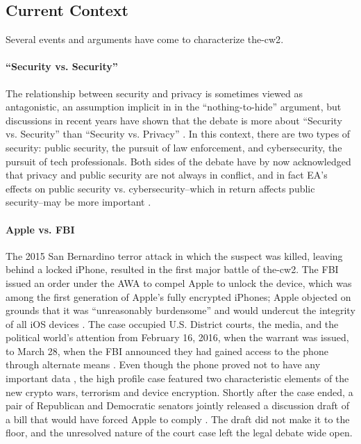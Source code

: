 \subsection{Current Context}
\label{sec-history-current}

Several events and arguments have come to characterize \ac{the-cw2}.

\paragraph*{``Security vs. Security''} The relationship between security and privacy is sometimes viewed as
antagonistic, an assumption implicit in in the ``nothing-to-hide'' argument, but discussions in recent years have shown
that the debate is more about ``Security vs. Security'' than ``Security vs. Privacy''
\cite{stalla_bourdillon_privacy_2014}. In this context, there are two types of security: public security, the pursuit of
law enforcement, and cybersecurity, the pursuit of tech professionals. Both sides of the debate have by now acknowledged
that privacy and public security are not always in conflict, and in fact \ac{EA}'s effects on public security vs.
cybersecurity--which in return affects public security--may be more important \cite{schneier_2019}.

\paragraph*{Apple vs. FBI} The 2015 San Bernardino terror attack in which the suspect was killed, leaving behind a
locked iPhone, resulted in the first major battle of \ac{the-cw2}. The \ac{FBI} issued an order under the \acrlong{AWA}
to compel Apple to unlock the device, which was among the first generation of Apple's fully encrypted iPhones; Apple
objected on grounds that it was ``unreasonably burdensome'' and would undercut the integrity of all iOS devices
\cite{schulze_clipper_2017}. The case occupied U.S. District courts, the media, and the political world's attention from
February 16, 2016, when the warrant was issued, to March 28, when the \ac{FBI} announced they had gained access to the
phone through alternate means \cite{novet_2016}. Even though the phone proved not to have any important data
\cite{schulze_clipper_2017}, the high profile case featured two characteristic elements of the new crypto wars,
terrorism and device encryption. Shortly after the case ended, a pair of Republican and Democratic senators jointly
released a discussion draft of a bill that would have forced Apple to comply \cite{burr_2016}. The draft did not make it
to the floor, and the unresolved nature of the court case left the legal debate wide open.

